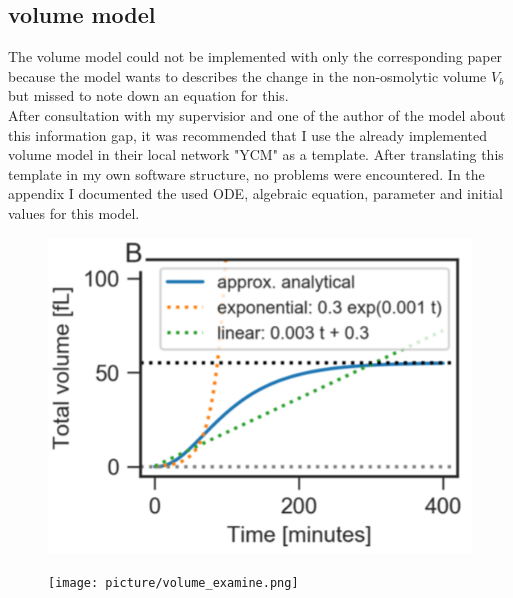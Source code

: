 \subsection{volume model}
The volume model could not be implemented with only the corresponding paper because the model wants to describes the change in the non-osmolytic volume $V_b$ but missed to note down an equation for this.\\
After consultation with my supervisior and one of the author of the model about this information gap, it was recommended that I use the already implemented volume model in their local network "YCM" as a template. After translating this template in my own software structure, no problems were encountered. In the appendix I documented the used ODE, algebraic equation, parameter and initial values for this model. 
\begin{figure}[htbp]
	
	\begin{minipage}{0,5\textwidth}
		
		\includegraphics[width=\textwidth]{picture/Volume_Paper.png}
		
		\label{IonPadper} 
	\end{minipage}
	\begin{minipage}{0,5\textwidth}
		
		\texttt{[image: picture/volume\_examine.png]}
		
		\label{IonImpledmented} 
	\end{minipage}
	\caption{}
\end{figure}


